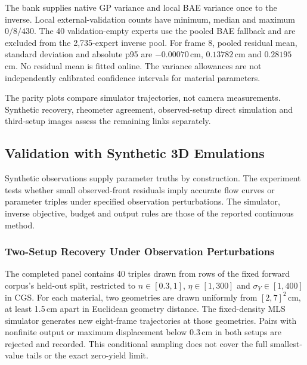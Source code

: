The bank supplies native GP variance and local BAE variance once to
the inverse. Local external-validation counts have minimum, median and
maximum $0/8/430$. The 40 validation-empty experts use the pooled
BAE fallback and are excluded from the 2,735-expert inverse pool.
For frame 8, pooled residual mean, standard deviation and absolute
p95 are $-0.00070$\,cm, $0.13782$\,cm and $0.28195$\,cm.
No residual mean is fitted online. The variance allowances are not
independently calibrated confidence intervals for material parameters.

The parity plots compare simulator trajectories, not camera measurements.
Synthetic recovery, rheometer agreement, observed-setup direct simulation
and third-setup images assess the remaining links separately.


\subsection{Validation with Synthetic 3D Emulations}
\label{sec:mainresults}

Synthetic observations supply parameter truths by construction.
The experiment tests whether small observed-front residuals imply
accurate flow curves or parameter triples under specified observation
perturbations. The simulator, inverse objective, budget and output
rules are those of the reported continuous method.



\subsubsection{Two-Setup Recovery Under Observation Perturbations}
\label{sec:continuous-synthetic}
The completed panel contains 40 triples drawn from rows of the fixed
forward corpus's held-out split, restricted to $n\in[0.3,1]$,
$\eta\in[1,300]$ and $\sigma_Y\in[1,400]$ in CGS.
For each material, two geometries are drawn uniformly from
$[2,7]^2$\,cm, at least 1.5\,cm apart in Euclidean geometry distance.
The fixed-density MLS simulator generates new eight-frame trajectories
at those geometries. Pairs with nonfinite output or maximum displacement
below 0.3\,cm in both setups are rejected and recorded.
This conditional sampling does not cover the full smallest-value
tails or the exact zero-yield limit.

